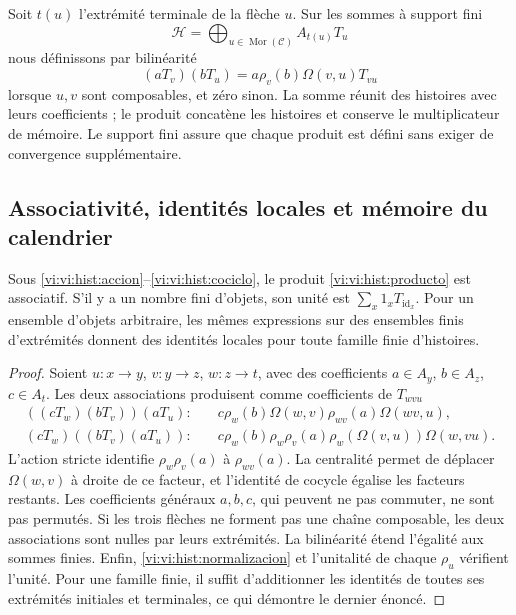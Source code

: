 Soit \(t(u)\) l’extrémité terminale de la flèche \(u\). Sur les sommes
à support fini
\[
 \mathcal H=\bigoplus_{u\in\operatorname{Mor}(\mathcal C)}A_{t(u)}T_u
\]
nous définissons par bilinéarité
\begin{equation}
 (aT_v)(bT_u)=
 a\rho_v(b)\Omega(v,u)T_{vu}
 \label{vi:vi:hist:producto}
\end{equation}
lorsque \(u,v\) sont composables, et zéro sinon. La somme réunit
des histoires avec leurs coefficients ; le produit concatène les histoires et
conserve le multiplicateur de mémoire. Le support fini assure que chaque
produit est défini sans exiger de convergence supplémentaire.

\subsection{Associativité, identités locales et mémoire du calendrier}
\label{vi:vi:hist:asociatividad}

\begin{proposition}
Sous \eqref{vi:vi:hist:accion}--\eqref{vi:vi:hist:cociclo}, le produit
\eqref{vi:vi:hist:producto} est associatif. S'il y a un nombre fini d'objets, son unité
est \(\sum_x1_xT_{\operatorname{id}_x}\). Pour un ensemble d'objets
arbitraire, les mêmes expressions sur des ensembles finis d'extrémités
donnent des identités locales pour toute famille finie d'histoires.
\end{proposition}
\begin{proof}
Soient \(u:x\to y\), \(v:y\to z\), \(w:z\to t\), avec des coefficients
\(a\in A_y\), \(b\in A_z\), \(c\in A_t\). Les deux associations
produisent comme coefficients de \(T_{wvu}\)
\begin{align*}
 ((cT_w)(bT_v))(aT_u):\quad&
 c\rho_w(b)\Omega(w,v)\rho_{wv}(a)\Omega(wv,u),\\
 (cT_w)((bT_v)(aT_u)):\quad&
 c\rho_w(b)\rho_w\rho_v(a)
 \rho_w(\Omega(v,u))\Omega(w,vu).
\end{align*}
L'action stricte identifie \(\rho_w\rho_v(a)\) à
\(\rho_{wv}(a)\). La centralité permet de déplacer
\(\Omega(w,v)\) à droite de ce facteur, et l'identité de cocycle
égalise les facteurs restants. Les coefficients généraux
\(a,b,c\), qui peuvent ne pas commuter, ne sont pas permutés. Si les trois flèches ne forment pas une
chaîne composable, les deux associations sont nulles par leurs extrémités.
La bilinéarité étend l'égalité aux sommes finies. Enfin,
\eqref{vi:vi:hist:normalizacion} et l'unitalité de chaque \(\rho_u\)
vérifient l'unité. Pour une famille finie, il suffit d'additionner les identités
de toutes ses extrémités initiales et terminales, ce qui démontre le dernier
énoncé.
\end{proof}

